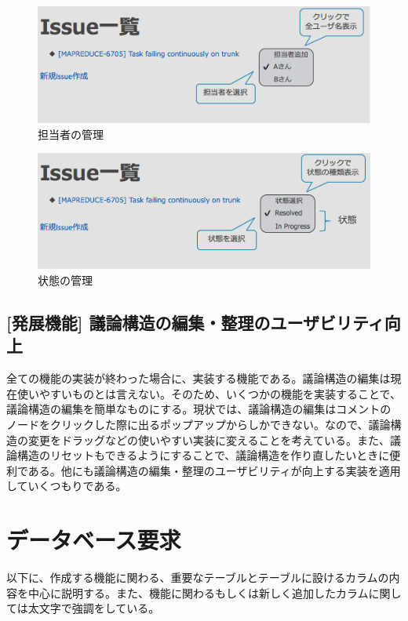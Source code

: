 \documentclass[12pt, oneside]{jreport}
\begin{document}
		\begin{figure}[H]
		\centering
		\includegraphics[width=17cm,bb=500 300 -200 27]{IssueManager.png}
		\caption{担当者の管理}
		\end{figure}
		
		\begin{figure}[H]
		\centering
		\includegraphics[width=17cm,bb=500 300 -200 27]{IssueState.png}
		\caption{状態の管理}
		\end{figure}

		\subsection{[発展機能] 議論構造の編集・整理のユーザビリティ向上}
		全ての機能の実装が終わった場合に、実装する機能である。議論構造の編集は現在使いやすいものとは言えない。そのため、いくつかの機能を実装することで、議論構造の編集を簡単なものにする。現状では、議論構造の編集はコメントのノードをクリックした際に出るポップアップからしかできない。なので、議論構造の変更をドラッグなどの使いやすい実装に変えることを考えている。また、議論構造のリセットもできるようにすることで、議論構造を作り直したいときに便利である。他にも議論構造の編集・整理のユーザビリティが向上する実装を適用していくつもりである。

	\section{データベース要求}
	
	以下に、作成する機能に関わる、重要なテーブルとテーブルに設けるカラムの内容を中心に説明する。また、機能に関わるもしくは新しく追加したカラムに関しては太文字で強調をしている。
	
\end{document}
